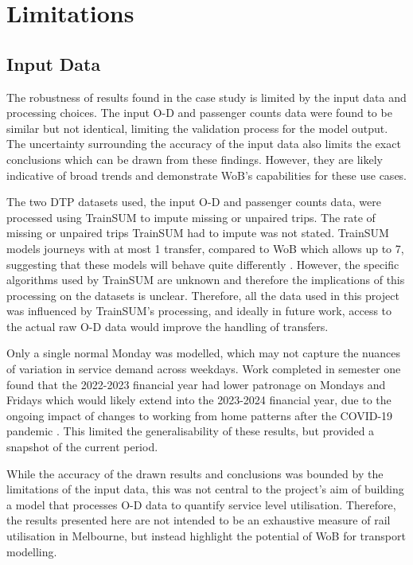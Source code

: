\section{Limitations}
\subsection{Input Data}
The robustness of results found in the case study is limited by the input data and processing choices. The input O-D and passenger counts data were found to be similar but not identical, limiting the validation process for the model output. The uncertainty surrounding the accuracy of the input data also limits the exact conclusions which can be drawn from these findings. However, they are likely indicative of broad trends and demonstrate WoB's capabilities for these use cases. 

The two DTP datasets used, the input O-D and passenger counts data, were processed using TrainSUM to impute missing or unpaired trips. The rate of missing or unpaired trips TrainSUM had to impute was not stated. TrainSUM models journeys with at most 1 transfer, compared to WoB which allows up to 7, suggesting that these models will behave quite differently \cite{victoriandepartmentoftransportandplanningAnnualMetropolitanRegional2024}. However, the specific algorithms used by TrainSUM are unknown and therefore the implications of this processing on the datasets is unclear. Therefore, all the data used in this project was influenced by TrainSUM's processing, and ideally in future work, access to the actual raw O-D data would improve the handling of transfers. 

Only a single normal Monday was modelled, which may not capture the nuances of variation in service demand across weekdays. Work completed in semester one found that the 2022-2023 financial year had lower patronage on Mondays and Fridays which would likely extend into the 2023-2024 financial year, due to the ongoing impact of changes to working from home patterns after the COVID-19 pandemic \cite{tranChangesPeakPeriods2024}. This limited the generalisability of these results, but provided a snapshot of the current period. 

While the accuracy of the drawn results and conclusions was bounded by the limitations of the input data, this was not central to the project's aim of building a model that processes O-D data to quantify service level utilisation. Therefore, the results presented here are not intended to be an exhaustive measure of rail utilisation in Melbourne, but instead highlight the potential of WoB for transport modelling. 

